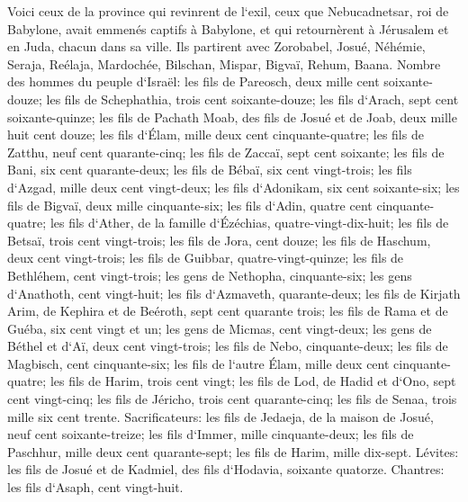\verse Voici ceux de la province qui revinrent de l`exil, ceux que Nebucadnetsar, roi de Babylone, avait emmenés captifs à Babylone, et qui retournèrent à Jérusalem et en Juda, chacun dans sa ville. 
\verse Ils partirent avec Zorobabel, Josué, Néhémie, Seraja, Reélaja, Mardochée, Bilschan, Mispar, Bigvaï, Rehum, Baana. Nombre des hommes du peuple d`Israël: 
\verse les fils de Pareosch, deux mille cent soixante-douze; 
\verse les fils de Schephathia, trois cent soixante-douze; 
\verse les fils d`Arach, sept cent soixante-quinze; 
\verse les fils de Pachath Moab, des fils de Josué et de Joab, deux mille huit cent douze; 
\verse les fils d`Élam, mille deux cent cinquante-quatre; 
\verse les fils de Zatthu, neuf cent quarante-cinq; 
\verse les fils de Zaccaï, sept cent soixante; 
\verse les fils de Bani, six cent quarante-deux; 
\verse les fils de Bébaï, six cent vingt-trois; 
\verse les fils d`Azgad, mille deux cent vingt-deux; 
\verse les fils d`Adonikam, six cent soixante-six; 
\verse les fils de Bigvaï, deux mille cinquante-six; 
\verse les fils d`Adin, quatre cent cinquante-quatre; 
\verse les fils d`Ather, de la famille d`Ézéchias, quatre-vingt-dix-huit; 
\verse les fils de Betsaï, trois cent vingt-trois; 
\verse les fils de Jora, cent douze; 
\verse les fils de Haschum, deux cent vingt-trois; 
\verse les fils de Guibbar, quatre-vingt-quinze; 
\verse les fils de Bethléhem, cent vingt-trois; 
\verse les gens de Nethopha, cinquante-six; 
\verse les gens d`Anathoth, cent vingt-huit; 
\verse les fils d`Azmaveth, quarante-deux; 
\verse les fils de Kirjath Arim, de Kephira et de Beéroth, sept cent quarante trois; 
\verse les fils de Rama et de Guéba, six cent vingt et un; 
\verse les gens de Micmas, cent vingt-deux; 
\verse les gens de Béthel et d`Aï, deux cent vingt-trois; 
\verse les fils de Nebo, cinquante-deux; 
\verse les fils de Magbisch, cent cinquante-six; 
\verse les fils de l`autre Élam, mille deux cent cinquante-quatre; 
\verse les fils de Harim, trois cent vingt; 
\verse les fils de Lod, de Hadid et d`Ono, sept cent vingt-cinq; 
\verse les fils de Jéricho, trois cent quarante-cinq; 
\verse les fils de Senaa, trois mille six cent trente. 
\verse Sacrificateurs: les fils de Jedaeja, de la maison de Josué, neuf cent soixante-treize; 
\verse les fils d`Immer, mille cinquante-deux; 
\verse les fils de Paschhur, mille deux cent quarante-sept; 
\verse les fils de Harim, mille dix-sept. 
\verse Lévites: les fils de Josué et de Kadmiel, des fils d`Hodavia, soixante quatorze. 
\verse Chantres: les fils d`Asaph, cent vingt-huit. 
